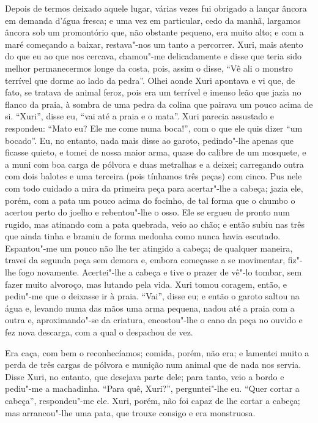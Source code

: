Depois de termos deixado aquele lugar, várias vezes fui obrigado a
lançar âncora em demanda d'água fresca; e uma vez em particular, cedo da
manhã, largamos âncora sob um promontório que, não obstante pequeno, era
muito alto; e com a maré começando a baixar, restava"-nos um tanto a
percorrer. Xuri, mais atento do que eu ao que nos cercava, chamou"-me
delicadamente e disse que teria sido melhor permanecermos longe da
costa, pois, assim o disse, ``Vê ali o monstro terrível que dorme ao
lado da pedra''. Olhei aonde Xuri apontava e vi que, de fato, se tratava
de animal feroz, pois era um terrível e imenso leão que jazia no flanco
da praia, à sombra de uma pedra da colina que pairava um pouco acima de
si. ``Xuri'', disse eu, ``vai até a praia e o mata''. Xuri parecia
assustado e respondeu: ``Mato eu? Ele me come numa boca!'', com o que
ele quis dizer ``um bocado''. Eu, no entanto, nada mais disse ao garoto,
pedindo"-lhe apenas que ficasse quieto, e tomei de nossa maior arma,
quase do calibre de um mosquete, e a muni com boa carga de pólvora e
duas metralhas e a deixei; carregando outra com dois balotes e uma
terceira (pois tínhamos três peças) com cinco. Pus nele com todo cuidado
a mira da primeira peça para acertar"-lhe a cabeça; jazia ele, porém, com
a pata um pouco acima do focinho, de tal forma que o chumbo o acertou
perto do joelho e rebentou"-lhe o osso. Ele se ergueu de pronto num
rugido, mas atinando com a pata quebrada, veio ao chão; e então subiu
nas três que ainda tinha e bramiu de forma medonha como nunca havia
escutado. Espantou"-me um pouco não lhe ter atingido a cabeça; de
qualquer maneira, travei da segunda peça sem demora e, embora começasse
a se movimentar, fiz"-lhe fogo novamente. Acertei"-lhe a cabeça e tive o
prazer de vê"-lo tombar, sem fazer muito alvoroço, mas lutando pela vida.
Xuri tomou coragem, então, e pediu"-me que o deixasse ir à praia.
``Vai'', disse eu; e então o garoto saltou na água e, levando numa das
mãos uma arma pequena, nadou até a praia com a outra e, aproximando"-se
da criatura, encostou"-lhe o cano da peça no ouvido e fez nova descarga,
com a qual o despachou de vez.

Era caça, com bem o reconhecíamos; comida, porém, não era; e lamentei
muito a perda de três cargas de pólvora e munição num animal que de nada
nos servia. Disse Xuri, no entanto, que desejava parte dele; para tanto,
veio a bordo e pediu"-me a machadinha. ``Para quê, Xuri?'', perguntei"-lhe
eu. ``Quer cortar a cabeça'', respondeu"-me ele. Xuri, porém, não foi
capaz de lhe cortar a cabeça; mas arrancou"-lhe uma pata, que trouxe
consigo e era monstruosa.

